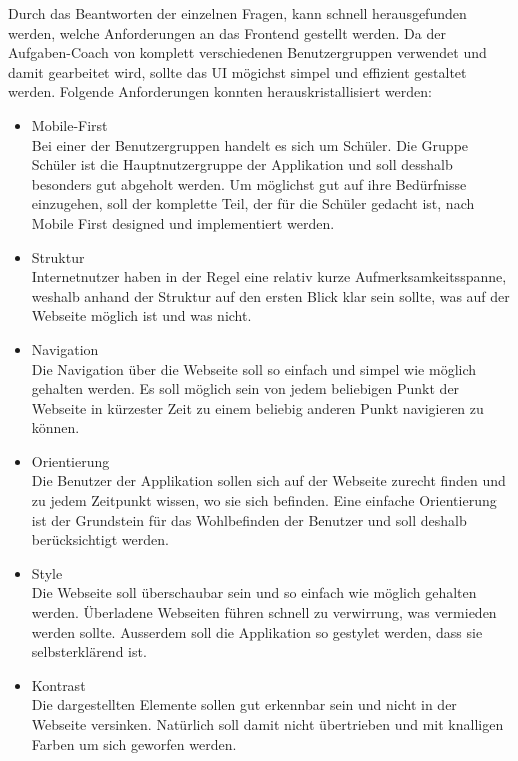 Durch das Beantworten der einzelnen Fragen, kann schnell herausgefunden werden, welche Anforderungen an das Frontend gestellt werden. Da der Aufgaben-Coach von komplett verschiedenen Benutzergruppen verwendet und damit gearbeitet wird, sollte das UI mögichst simpel und effizient gestaltet werden. Folgende Anforderungen konnten herauskristallisiert werden:

\begin{itemize}
	\item Mobile-First \\
		Bei einer der Benutzergruppen handelt es sich um Schüler. Die Gruppe Schüler ist die Hauptnutzergruppe der Applikation und soll desshalb besonders gut abgeholt werden. Um möglichst gut auf ihre Bedürfnisse einzugehen, soll der komplette Teil, der für die Schüler gedacht ist, nach Mobile First designed und implementiert werden.
		
	\item Struktur \\
		Internetnutzer haben in der Regel eine relativ kurze Aufmerksamkeitsspanne, weshalb anhand der Struktur auf den ersten Blick klar sein sollte, was auf der Webseite möglich ist und was nicht. 
		
	\item Navigation \\
		Die Navigation über die Webseite soll so einfach und simpel wie möglich gehalten werden. Es soll möglich sein von jedem beliebigen Punkt der Webseite in kürzester Zeit zu einem beliebig anderen Punkt navigieren zu können.
		
	
	\item Orientierung \\
		Die Benutzer der Applikation sollen sich auf der Webseite zurecht finden und zu jedem Zeitpunkt wissen, wo sie sich befinden. Eine einfache Orientierung ist der Grundstein für das Wohlbefinden der Benutzer und soll deshalb berücksichtigt werden.
		
	\item Style \\
		Die Webseite soll überschaubar sein und so einfach wie möglich gehalten werden. Überladene Webseiten führen schnell zu verwirrung, was vermieden werden sollte. Ausserdem soll die Applikation so gestylet werden, dass sie selbsterklärend ist.
		
	\item Kontrast \\
		Die dargestellten Elemente sollen gut erkennbar sein und nicht in der Webseite versinken. Natürlich soll damit nicht übertrieben und mit knalligen Farben um sich geworfen werden.
\end{itemize}

